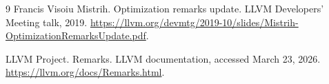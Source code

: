 \documentclass{article}
\begin{document}
\begin{thebibliography}{9}
Francis Visoiu Mistrih.
\newblock Optimization remarks update.
\newblock LLVM Developers' Meeting talk, 2019.
\newblock \url{https://llvm.org/devmtg/2019-10/slides/Mistrih-OptimizationRemarksUpdate.pdf}.

LLVM Project.
\newblock Remarks.
\newblock LLVM documentation, accessed March 23, 2026.
\newblock \url{https://llvm.org/docs/Remarks.html}.

\end{thebibliography}
\end{document}
